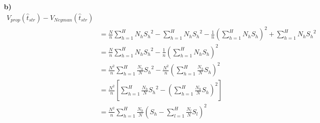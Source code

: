 \documentclass[11pt]{article}
\begin{document}
\textbf{b)}
\begin{align*} 
V_{prop}(\hat{t}_{str})  - V_{Neyman}(\hat{t}_{str}) \\
 & = \frac{N}{n}\sum_{h=1}^{H}{N_h{S_h}^2} -  \sum_{h=1}^{H}{N_h{S_h}^2} -  \frac{1}{n}(\sum_{h=1}^{H}{N_hS_h})^2 + \sum_{h=1}^{H}{N_h{S_h}^2}\\
& =  \frac{N}{n}\sum_{h=1}^{H}{N_h{S_h}^2} -  \frac{1}{n}(\sum_{h=1}^{H}{N_hS_h})^2\\
& =  \frac{N^2}{n}\sum_{h=1}^{H}{\frac{N_h}{N}{S_h}^2} - \frac{N^2}{n}(\sum_{h=1}^{H}{\frac{N_h}{N}S_h})^2\\
& =  \frac{N^2}{n}[\sum_{h=1}^{H}{\frac{N_h}{N}{S_h}^2} - (\sum_{h=1}^{H}{\frac{N_h}{N}S_h})^2]\\
& =  \frac{N^2}{n}\sum_{h=1}^{H}{\frac{N_h}{N}(S_h-\sum_{l=1}^{H}{\frac{N_l}{N}S_l})^2}
\end{align*}
\end{document}
